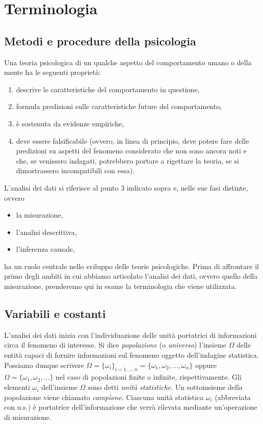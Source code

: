 \chapter{Terminologia}
\label{chapter:terminologia} 



\section{Metodi e procedure della psicologia}

Una teoria psicologica di un qualche aspetto del comportamento umano o della mente ha le seguenti proprietà:
\begin{enumerate}
\item
descrive le caratteristiche del comportamento in questione,
\item 
formula predizioni sulle caratteristiche future del comportamento,
\item 
è sostenuta da evidenze empiriche,
\item
deve essere falsificabile (ovvero, in linea di principio, deve potere fare delle predizioni su aspetti del fenomeno considerato che non sono ancora noti e che, se venissero indagati, potrebbero portare a rigettare la teoria, se si dimostrassero incompatibili con essa).
\end{enumerate}

L'analisi dei dati si riferisce al punto 3 indicato sopra e, nelle sue fasi distinte, ovvero 
\begin{itemize}
\item la misurazione, 
\item l'analisi descrittiva, 
\item l'inferenza causale, 
\end{itemize}
ha un ruolo centrale nello sviluppo delle teorie psicologiche.
Prima di affrontare il primo degli ambiti in cui abbiamo articolato l'analisi dei dati, ovvero quello della misurazione, prenderemo qui in esame la terminologia che viene utilizzata. 


\section{Variabili e costanti}

L'analisi dei dati inizia con l'individuazione delle unità portatrici di informazioni circa il fenomeno di interesse. 
Si dice \emph{popolazione} (o \emph{universo}) l'insieme $\Omega$ delle entità capaci di fornire informazioni sul fenomeno oggetto dell'indagine statistica. 
Possiamo dunque scrivere
$
\Omega = \{\omega_i\}_{i=1, \dots, n}= \{\omega_1, \omega_2, \dots, \omega_n\}
$
oppure
$
\Omega =  \{\omega_1, \omega_2, \dots \}
$
nel caso di popolazioni finite o infinite, rispettivamente. 
Gli elementi $\omega_i$ dell'insieme $\Omega$ sono detti \emph{unità statistiche}.
Un sottoinsieme della popolazione viene chiamato \emph{campione}.
Ciascuna unità statistica $\omega_i$ (abbreviata con u.s.) è portatrice dell'informazione che verrà rilevata mediante un'operazione di misurazione.


